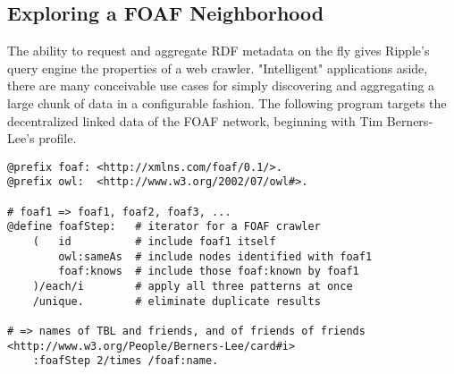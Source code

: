 \documentclass[runningheads]{llncs}
\begin{document}
\subsection{Exploring a FOAF Neighborhood}
The ability to request and aggregate RDF metadata on the fly gives Ripple's query engine the properties of a web crawler.  "Intelligent" applications aside, there are many conceivable use cases for simply discovering and aggregating a large chunk of data in a configurable fashion.  The following program targets the decentralized linked data of the FOAF network, beginning with Tim Berners-Lee's profile.
\begin{verbatim}
@prefix foaf: <http://xmlns.com/foaf/0.1/>.
@prefix owl:  <http://www.w3.org/2002/07/owl#>.

# foaf1 => foaf1, foaf2, foaf3, ...
@define foafStep:   # iterator for a FOAF crawler
    (   id          # include foaf1 itself
        owl:sameAs  # include nodes identified with foaf1
        foaf:knows  # include those foaf:known by foaf1
    )/each/i        # apply all three patterns at once
    /unique.        # eliminate duplicate results

# => names of TBL and friends, and of friends of friends
<http://www.w3.org/People/Berners-Lee/card#i>
    :foafStep 2/times /foaf:name.
\end{verbatim}
\end{document}

